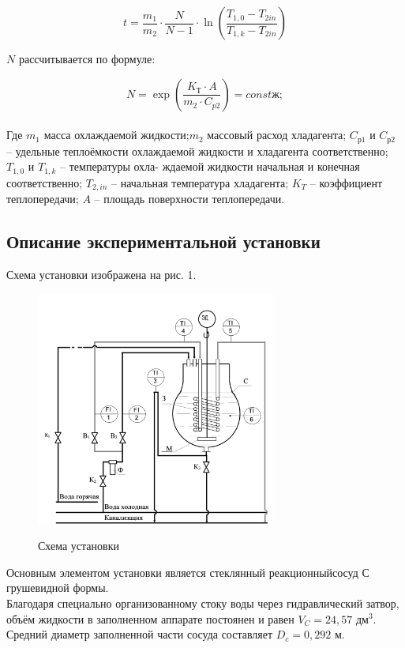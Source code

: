 \documentclass[12pt, a4paper]{article}
\begin{document}
\begin{equation}
    t = \frac{m_1}{m_2} \cdot \frac{N}{N - 1} \cdot \ln\left( {\frac{T_{1,0} - T_{2in}}{T_{1,k} - T_{2in}}}\right)
\end{equation}

$N$ рассчитывается по формуле:

$$N = \exp\left(\frac{K_{Т} \cdot A}{m_2 \cdot C_{p2}}\right) = constж;$$\\ 
Где $m_1$ масса охлаждаемой жидкости;$m_2$ массовый расход хладагента; $C_{р1}$ и $C_{р2}$ – удельные теплоёмкости 
охлаждаемой жидкости и хладагента соответственно; $T_{1,0}$ и $T_{1,k}$ – температуры охла-
ждаемой жидкости начальная и конечная соответственно; $T_{2,in}$ – начальная
температура хладагента; $K_T$ – коэффициент теплопередачи; $A$ – площадь
поверхности теплопередачи.


\newpage
\begin{center}
\subsection*{Описание экспериментальной установки}
\end{center}
Схема установки изображена на рис. 1.
\begin{figure}[h]
    \centering
    \includegraphics[width=0.7\textwidth]{img/schema.png}~
    \caption{Схема установки}
\end{figure}

Основным элементом установки является стеклянный реакционныйсосуд С грушевидной формы.\\

Благодаря специально организованному стоку воды через гидравлический затвор, объём жидкости в заполненном аппарате постоянен и равен $V_C = 24,57$ дм$^3$.
Средний диаметр заполненной части сосуда составляет $D_c = 0,292$ м.\\
\end{document}

